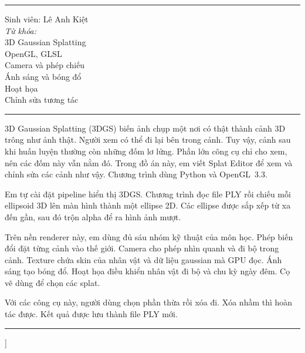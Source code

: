 \documentclass[9pt,twocolumn,a4paper]{extarticle}
\newcommand{\spaced}[1]{\textls[160]{#1}}
\begin{document}
{\begin{@twocolumnfalse}
\noindent\begin{minipage}[t]{0.255\textwidth}
{\footnotesize\spaced{T H Ô N G \ \ T I N}\par}
\vspace{2pt}\noindent\rule{\linewidth}{0.4pt}\par\vspace{3pt}
{\scriptsize Sinh viên: Lê Anh Kiệt\\[3pt]
\textit{Từ khóa:}\\
3D Gaussian Splatting\\
OpenGL, GLSL\\
Camera và phép chiếu\\
Ánh sáng và bóng đổ\\
Hoạt họa\\
Chỉnh sửa tương tác\par}
\end{minipage}\hfill
\begin{minipage}[t]{0.715\textwidth}
{\footnotesize\spaced{T Ó M \ \ T Ắ T}\par}
\vspace{2pt}\noindent\rule{\linewidth}{0.4pt}\par\vspace{3pt}
{\scriptsize\setlength{\parindent}{0pt}\linespread{1.08}\selectfont
3D Gaussian Splatting (3DGS) biến ảnh chụp một nơi có thật thành cảnh 3D trông như ảnh thật. Người xem có thể đi lại bên trong cảnh. Tuy vậy, cảnh sau khi huấn luyện thường còn những đốm lơ lửng. Phần lớn công cụ chỉ cho xem, nên các đốm này vẫn nằm đó. Trong đồ án này, em viết Splat Editor để xem và chỉnh sửa các cảnh như vậy. Chương trình dùng Python và OpenGL~3.3.

Em tự cài đặt pipeline hiển thị 3DGS. Chương trình đọc file PLY rồi chiếu mỗi ellipsoid 3D lên màn hình thành một ellipse 2D. Các ellipse được sắp xếp từ xa đến gần, sau đó trộn alpha để ra hình ảnh mượt.

Trên nền renderer này, em dùng đủ sáu nhóm kỹ thuật của môn học. Phép biến đổi đặt từng cảnh vào thế giới. Camera cho phép nhìn quanh và đi bộ trong cảnh. Texture chứa skin của nhân vật và dữ liệu gaussian mà GPU đọc. Ánh sáng tạo bóng đổ. Hoạt họa điều khiển nhân vật đi bộ và chu kỳ ngày đêm. Cọ vẽ dùng để chọn các splat.

Với các công cụ này, người dùng chọn phần thừa rồi xóa đi. Xóa nhầm thì hoàn tác được. Kết quả được lưu thành file PLY mới.\par}
\end{minipage}

\vspace{0.25cm}
\noindent\rule{\textwidth}{0.4pt}
\vspace{0.35cm}
\end{@twocolumnfalse}
}]
\end{document}
